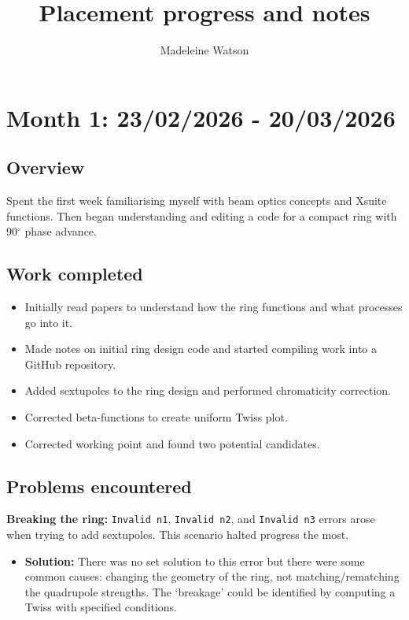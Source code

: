 \documentclass{article}
\title{Placement progress and notes}
\author{Madeleine Watson}
\begin{document}
\maketitle

\tableofcontents


\section{Month 1: 23/02/2026 - 20/03/2026}
\subsection{Overview}

Spent the first week familiarising myself with beam optics concepts and Xsuite functions. Then began understanding and editing a code for a compact ring with 90$^\circ$ phase advance.

\subsection{Work completed}

\begin{itemize}
\item Initially read papers to understand how the ring functions and what processes go into it.
\item Made notes on initial ring design code and started compiling work into a GitHub repository.
\item Added sextupoles to the ring design and performed chromaticity correction.
\item Corrected beta-functions to create uniform Twiss plot.
\item Corrected working point and found two potential candidates.
\end{itemize}

\subsection{Problems encountered}

\textbf{Breaking the ring:} \texttt{Invalid n1}, \texttt{Invalid n2}, and \texttt{Invalid n3} errors arose when trying to add sextupoles. This scenario halted progress the most.
\begin{itemize}
    \item \textbf{Solution:} There was no set solution to this error but there were some common causes: changing the geometry of the ring, not matching/rematching the quadrupole strengths. The `breakage' could be identified by computing a Twiss with specified conditions.
\end{itemize}
\end{document}
